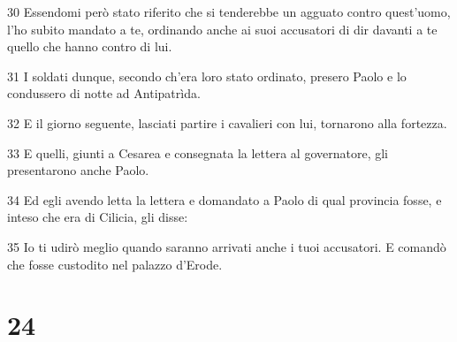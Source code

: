 \par 30 Essendomi però stato riferito che si tenderebbe un agguato contro quest'uomo, l'ho subito mandato a te, ordinando anche ai suoi accusatori di dir davanti a te quello che hanno contro di lui.
\par 31 I soldati dunque, secondo ch'era loro stato ordinato, presero Paolo e lo condussero di notte ad Antipatrìda.
\par 32 E il giorno seguente, lasciati partire i cavalieri con lui, tornarono alla fortezza.
\par 33 E quelli, giunti a Cesarea e consegnata la lettera al governatore, gli presentarono anche Paolo.
\par 34 Ed egli avendo letta la lettera e domandato a Paolo di qual provincia fosse, e inteso che era di Cilicia, gli disse:
\par 35 Io ti udirò meglio quando saranno arrivati anche i tuoi accusatori. E comandò che fosse custodito nel palazzo d'Erode.

\chapter{24}

